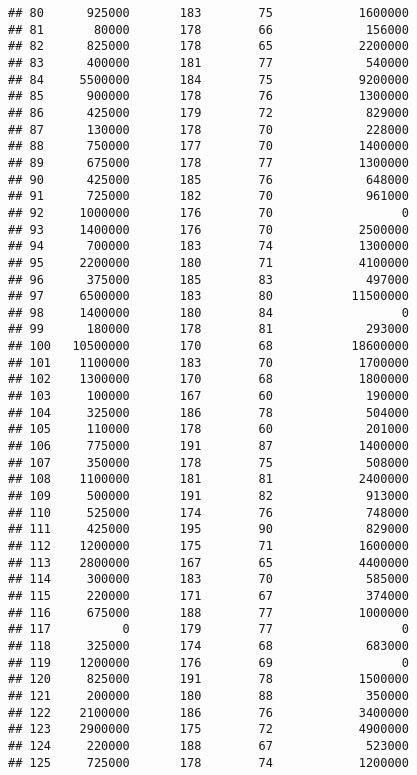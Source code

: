 \documentclass[
]{article}
\begin{document}
\begin{verbatim}
## 80      925000       183        75            1600000
## 81       80000       178        66             156000
## 82      825000       178        65            2200000
## 83      400000       181        77             540000
## 84     5500000       184        75            9200000
## 85      900000       178        76            1300000
## 86      425000       179        72             829000
## 87      130000       178        70             228000
## 88      750000       177        70            1400000
## 89      675000       178        77            1300000
## 90      425000       185        76             648000
## 91      725000       182        70             961000
## 92     1000000       176        70                  0
## 93     1400000       176        70            2500000
## 94      700000       183        74            1300000
## 95     2200000       180        71            4100000
## 96      375000       185        83             497000
## 97     6500000       183        80           11500000
## 98     1400000       180        84                  0
## 99      180000       178        81             293000
## 100   10500000       170        68           18600000
## 101    1100000       183        70            1700000
## 102    1300000       170        68            1800000
## 103     100000       167        60             190000
## 104     325000       186        78             504000
## 105     110000       178        60             201000
## 106     775000       191        87            1400000
## 107     350000       178        75             508000
## 108    1100000       181        81            2400000
## 109     500000       191        82             913000
## 110     525000       174        76             748000
## 111     425000       195        90             829000
## 112    1200000       175        71            1600000
## 113    2800000       167        65            4400000
## 114     300000       183        70             585000
## 115     220000       171        67             374000
## 116     675000       188        77            1000000
## 117          0       179        77                  0
## 118     325000       174        68             683000
## 119    1200000       176        69                  0
## 120     825000       191        78            1500000
## 121     200000       180        88             350000
## 122    2100000       186        76            3400000
## 123    2900000       175        72            4900000
## 124     220000       188        67             523000
## 125     725000       178        74            1200000

\end{verbatim}
\end{document}
